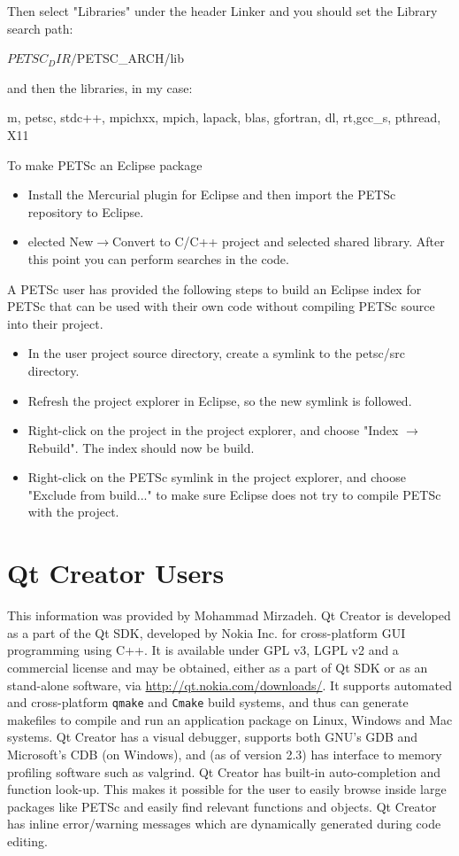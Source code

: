 {{Then select "Libraries" under the header Linker
and you should set the Library search path:
\begin{bashlisting}
${PETSC_DIR}/${PETSC_ARCH}/lib
\end{bashlisting}

and then the libraries, in my case:
\begin{bashlisting}
m, petsc, stdc++, mpichxx, mpich, lapack, blas, gfortran, dl, rt,gcc_s, pthread, X11
\end{bashlisting}

To make PETSc an Eclipse package
\begin{itemize}
\item Install the Mercurial plugin for Eclipse and then import the PETSc repository to Eclipse.
\item elected New$\rightarrow$Convert to C/C++ project and selected shared library. After this point you can perform searches in the code.
\end{itemize}

  A PETSc user has provided the following steps to build an Eclipse index for PETSc that can be used with their own code without compiling PETSc source into their project.
\begin{itemize}
\item In the user project source directory, create a symlink to the petsc/src directory.
\item Refresh the project explorer in Eclipse, so the new symlink is followed.
\item Right-click on the project in the project explorer, and choose "Index $\rightarrow$ Rebuild". The index should now be build.
\item Right-click on the PETSc symlink in the project explorer, and choose "Exclude from build..." to make sure Eclipse does not try to compile PETSc with the project.
\end{itemize}

\section{Qt Creator Users} 
This information was provided by Mohammad Mirzadeh.
Qt Creator is developed as a part of the Qt SDK, developed by Nokia Inc. for cross-platform GUI programming using C++. 
It is available under GPL v3, LGPL v2 and a commercial license and may be obtained, either as a part of Qt SDK or as an stand-alone software, via \url{http://qt.nokia.com/downloads/}.
It supports automated and cross-platform \texttt{qmake} and \texttt{Cmake} build systems, and thus can
generate makefiles to compile and run an application package on Linux, Windows and Mac systems.
Qt Creator has a visual debugger, supports both GNU's GDB and Microsoft's CDB (on Windows), and
(as of version 2.3) has interface to memory profiling software such as valgrind.
Qt Creator has built-in auto-completion and function look-up. 
This makes it possible for the user to easily browse inside large packages like PETSc and easily find relevant functions and objects.
Qt Creator has inline error/warning messages which are dynamically generated during code editing.

}}
